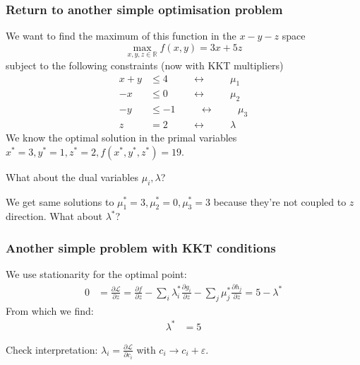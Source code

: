 \documentclass[10pt,aspectratio=169,dvipsnames]{beamer}
\def\l{\lambda}
\def\m{\mu}
\def\d{\partial}
\def\cL{\mathcal{L}}
\begin{document}
\begin{frame}
  \frametitle{Return to another simple optimisation problem}

  We want to find the maximum of this function in the $x-y-z$ space
  \begin{equation*}
    \max_{x,y,z\in \mathbb{R}} f(x,y) = 3x + 5z
  \end{equation*}
  subject to the following constraints (now with KKT multipliers)
  \begin{align*}
    x + y & \leq 4  \hspace{1cm}\leftrightarrow\hspace{1cm} \m_1 \\
    -x & \leq 0  \hspace{1cm}\leftrightarrow\hspace{1cm} \m_2\\
    -y & \leq -1  \hspace{1cm}\leftrightarrow\hspace{1cm} \m_3 \\
    z & = 2  \hspace{1cm}\leftrightarrow\hspace{1cm} \l
  \end{align*}
  We know the optimal solution in the \alert{primal variables} $x^* = 3, y^* = 1, z^* = 2, f(x^*,y^*,z^*) = 19$.

  What about the \alert{dual variables} $\m_i,\l$?

  We get same solutions to $\m_1^* = 3, \m_2^* = 0, \m_3^* =3$ because they're not coupled to $z$ direction. What about $\l^*$?

\end{frame}


\begin{frame}
  \frametitle{Another simple problem with KKT conditions}

  We use stationarity for the optimal point:
  \begin{align*}
    0 & = \frac{\d \cL}{\d z } =   \frac{\d f}{\d z} - \sum_i \l_i^* \frac{\d g_i}{\d z}  - \sum_j \m_j^* \frac{\d h_j}{\d z} = 5 - \l^*
  \end{align*}
  From which we find:
  \begin{align*}
    \l^* & = 5
  \end{align*}

  Check interpretation: $\l_i = \frac{\d \cL}{\d c_i}$ with $c_i \to c_i + \varepsilon$.
\end{frame}
\end{document}
